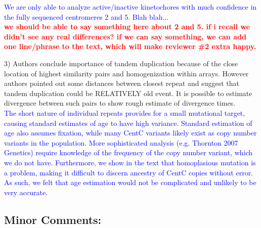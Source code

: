 \documentclass[]{article}
\newcommand{\res}[1]{\noindent \textcolor{blue}{{#1}} \\}
\newcommand{\jri}[1]{\textcolor{red}{{\bf #1}} }
\begin{document}
\res{We are only able to analyze active/inactive kinetochores with much confidence in the fully sequenced centromeres 2 and 5.  Blah blah... } \jri{ we should be able to say something here about 2 and 5. if i recall we didn't see any real differences? if we can say something, we can add one line/phrase to the text, which will make reviewer \#2 extra happy.\\ } 

3) Authors conclude importance of tandem duplication because of the close location of highest similarity pairs and homogenization within arrays. However authors pointed out some distances between closest repeat and suggest that tandem duplication could be RELATIVELY old event. It is possible to estimate divergence between such pairs to show rough estimate of divergence times.\\

\res{The short nature of individual repeats provides for a small mutational target, causing standard estimates of age to have high variance.  
Standard estimation of age also assumes fixation, while many CentC variants likely exist as copy number variants in the population. More sophisticated analysis (e.g. Thornton 2007 Genetics) require knowledge of the frequency of the copy number variant, which we do not have.
Furthermore, we show in the text that homoplasious mutation is a problem, making it difficult to discern ancestry of CentC copies without error.  As such, we felt that age estimation would not be complicated and unlikely to be very accurate.}

\subsection*{Minor Comments:}
\end{document}
